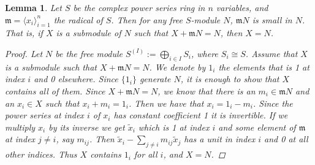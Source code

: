 \documentclass[11pt, a4paper, english]{article}
\newtheorem{lemma}[theorem]{Lemma}
\theoremstyle{definition}
\begin{document}
\begin{lemma}
\label{lem:radical small}
Let $S$ be the complex power series ring in $n$ variables, and $\mathfrak{m} = \langle x_i \rangle_{i=1}^n$ the radical of $S$. Then for any free $S$-module $N$, $\mathfrak{m}N$ is \textit{small} in $N$. That is, if $X$ is  a submodule of $N$ such that $X + \mathfrak{m}N = N$, then $X = N$.

\begin{proof}
Let $N$ be the free module $S^{(I)} := \bigoplus\limits_{i \in I} S_i$, where $S_i \cong S$. Assume that $X$ is a submodule such that $X + \mathfrak{m}N = N$. We denote by $1_i$ the elements that is 1 at index $i$ and 0 elsewhere. Since $\{ 1_i \}$ generate $N$, it is enough to show that $X$ contains all of them. Since $X + \mathfrak{m}N = N$, we know that there is an $m_i \in \mathfrak{m}N$ and an $x_i \in X$ such that $x_i + m_i = 1_i$. Then we have that $x_i = 1_i - m_i$. Since the power series at index $i$ of $x_i$ has constant coefficient 1 it is invertible. If we multiply $x_i$ by its inverse we get $\tilde{x}_i$ which is 1 at index $i$ and some element of $\mathfrak{m}$ at index $j \neq i$, say $m_{ij}$. Then $\tilde{x}_i - \sum\limits_{j \neq i} m_{ij}\tilde{x}_j$ has a unit in index $i$ and 0 at all other indices. Thus $X$ contains $1_i$ for all $i$, and $X = N$.
\end{proof}
\end{lemma}
\end{document}
